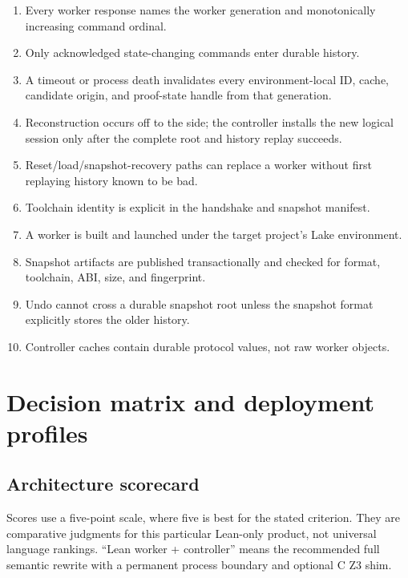 \documentclass[10pt,letterpaper,oneside]{report}
\begin{document}
\begin{enumerate}
  \item Every worker response names the worker generation and monotonically increasing command ordinal.
  \item Only acknowledged state-changing commands enter durable history.
  \item A timeout or process death invalidates every environment-local ID, cache, candidate origin, and proof-state handle from that generation.
  \item Reconstruction occurs off to the side; the controller installs the new logical session only after the complete root and history replay succeeds.
  \item Reset/load/snapshot-recovery paths can replace a worker without first replaying history known to be bad.
  \item Toolchain identity is explicit in the handshake and snapshot manifest.
  \item A worker is built and launched under the target project's Lake environment.
  \item Snapshot artifacts are published transactionally and checked for format, toolchain, ABI, size, and fingerprint.
  \item Undo cannot cross a durable snapshot root unless the snapshot format explicitly stores the older history.
  \item Controller caches contain durable protocol values, not raw worker objects.
\end{enumerate}

\chapter{Decision matrix and deployment profiles}\label{app:decision-matrix}

\section{Architecture scorecard}

Scores use a five-point scale, where five is best for the stated criterion. They are comparative judgments for this particular Lean-only product, not universal language rankings. ``Lean worker + controller'' means the recommended full semantic rewrite with a permanent process boundary and optional C Z3 shim.
\end{document}

